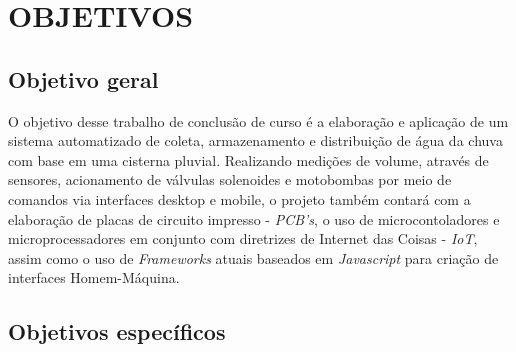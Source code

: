 
\chapter{OBJETIVOS}
\label{chap:objetivos}

\section{Objetivo geral}
\label{sec:objetivogeral}
O objetivo desse trabalho de conclusão de curso é a elaboração e aplicação de um sistema automatizado de coleta, armazenamento e distribuição de água da chuva com base em uma cisterna pluvial. Realizando medições de volume, através de sensores, acionamento de válvulas solenoides e motobombas por meio de comandos via interfaces desktop e mobile, o projeto também contará com a elaboração de placas de circuito impresso - \textit{PCB's}, o uso de microcontoladores e microprocessadores em conjunto com  diretrizes de Internet das Coisas - \textit{IoT},  assim como o uso de \textit{Frameworks} atuais baseados em \textit{Javascript} para criação de interfaces Homem-Máquina. 

\section{Objetivos específicos}

